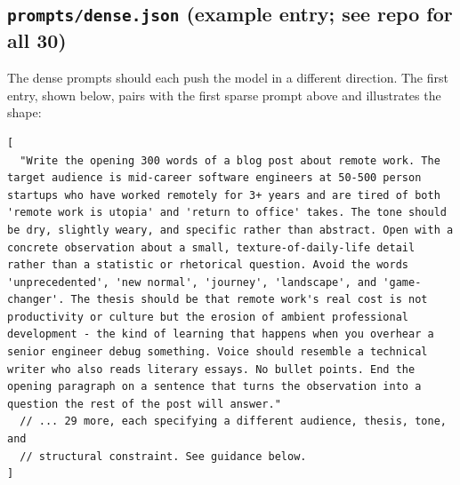 \documentclass[11pt]{article}
\begin{document}
\subsection{\texttt{prompts/dense.json} (example entry; see repo for all 30)}

The dense prompts should each push the model in a different direction. The first entry, shown below, pairs with the first sparse prompt above and illustrates the shape:

\begin{lstlisting}[style=jsonstyle,language={}]
[
  "Write the opening 300 words of a blog post about remote work. The target audience is mid-career software engineers at 50-500 person startups who have worked remotely for 3+ years and are tired of both 'remote work is utopia' and 'return to office' takes. The tone should be dry, slightly weary, and specific rather than abstract. Open with a concrete observation about a small, texture-of-daily-life detail rather than a statistic or rhetorical question. Avoid the words 'unprecedented', 'new normal', 'journey', 'landscape', and 'game-changer'. The thesis should be that remote work's real cost is not productivity or culture but the erosion of ambient professional development - the kind of learning that happens when you overhear a senior engineer debug something. Voice should resemble a technical writer who also reads literary essays. No bullet points. End the opening paragraph on a sentence that turns the observation into a question the rest of the post will answer."
  // ... 29 more, each specifying a different audience, thesis, tone, and
  // structural constraint. See guidance below.
]
\end{lstlisting}
\end{document}

